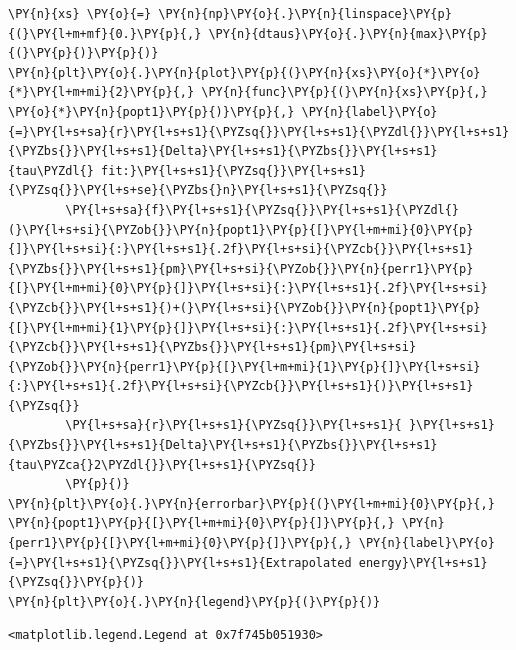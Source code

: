 \begin{tcolorbox}[breakable, size=fbox, boxrule=1pt, pad at break*=1mm,colback=cellbackground, colframe=cellborder]
\begin{Verbatim}[commandchars=\\\{\}]
\PY{n}{xs} \PY{o}{=} \PY{n}{np}\PY{o}{.}\PY{n}{linspace}\PY{p}{(}\PY{l+m+mf}{0.}\PY{p}{,} \PY{n}{dtaus}\PY{o}{.}\PY{n}{max}\PY{p}{(}\PY{p}{)}\PY{p}{)}
\PY{n}{plt}\PY{o}{.}\PY{n}{plot}\PY{p}{(}\PY{n}{xs}\PY{o}{*}\PY{o}{*}\PY{l+m+mi}{2}\PY{p}{,} \PY{n}{func}\PY{p}{(}\PY{n}{xs}\PY{p}{,} \PY{o}{*}\PY{n}{popt1}\PY{p}{)}\PY{p}{,} \PY{n}{label}\PY{o}{=}\PY{l+s+sa}{r}\PY{l+s+s1}{\PYZsq{}}\PY{l+s+s1}{\PYZdl{}}\PY{l+s+s1}{\PYZbs{}}\PY{l+s+s1}{Delta}\PY{l+s+s1}{\PYZbs{}}\PY{l+s+s1}{tau\PYZdl{} fit:}\PY{l+s+s1}{\PYZsq{}}\PY{l+s+s1}{\PYZsq{}}\PY{l+s+se}{\PYZbs{}n}\PY{l+s+s1}{\PYZsq{}}
        \PY{l+s+sa}{f}\PY{l+s+s1}{\PYZsq{}}\PY{l+s+s1}{\PYZdl{}(}\PY{l+s+si}{\PYZob{}}\PY{n}{popt1}\PY{p}{[}\PY{l+m+mi}{0}\PY{p}{]}\PY{l+s+si}{:}\PY{l+s+s1}{.2f}\PY{l+s+si}{\PYZcb{}}\PY{l+s+s1}{\PYZbs{}}\PY{l+s+s1}{pm}\PY{l+s+si}{\PYZob{}}\PY{n}{perr1}\PY{p}{[}\PY{l+m+mi}{0}\PY{p}{]}\PY{l+s+si}{:}\PY{l+s+s1}{.2f}\PY{l+s+si}{\PYZcb{}}\PY{l+s+s1}{)+(}\PY{l+s+si}{\PYZob{}}\PY{n}{popt1}\PY{p}{[}\PY{l+m+mi}{1}\PY{p}{]}\PY{l+s+si}{:}\PY{l+s+s1}{.2f}\PY{l+s+si}{\PYZcb{}}\PY{l+s+s1}{\PYZbs{}}\PY{l+s+s1}{pm}\PY{l+s+si}{\PYZob{}}\PY{n}{perr1}\PY{p}{[}\PY{l+m+mi}{1}\PY{p}{]}\PY{l+s+si}{:}\PY{l+s+s1}{.2f}\PY{l+s+si}{\PYZcb{}}\PY{l+s+s1}{)}\PY{l+s+s1}{\PYZsq{}}
        \PY{l+s+sa}{r}\PY{l+s+s1}{\PYZsq{}}\PY{l+s+s1}{ }\PY{l+s+s1}{\PYZbs{}}\PY{l+s+s1}{Delta}\PY{l+s+s1}{\PYZbs{}}\PY{l+s+s1}{tau\PYZca{}2\PYZdl{}}\PY{l+s+s1}{\PYZsq{}}
        \PY{p}{)}
\PY{n}{plt}\PY{o}{.}\PY{n}{errorbar}\PY{p}{(}\PY{l+m+mi}{0}\PY{p}{,} \PY{n}{popt1}\PY{p}{[}\PY{l+m+mi}{0}\PY{p}{]}\PY{p}{,} \PY{n}{perr1}\PY{p}{[}\PY{l+m+mi}{0}\PY{p}{]}\PY{p}{,} \PY{n}{label}\PY{o}{=}\PY{l+s+s1}{\PYZsq{}}\PY{l+s+s1}{Extrapolated energy}\PY{l+s+s1}{\PYZsq{}}\PY{p}{)}
\PY{n}{plt}\PY{o}{.}\PY{n}{legend}\PY{p}{(}\PY{p}{)}
\end{Verbatim}
\end{tcolorbox}

            \begin{tcolorbox}[breakable, size=fbox, boxrule=.5pt, pad at break*=1mm, opacityfill=0]
\begin{Verbatim}[commandchars=\\\{\}]
<matplotlib.legend.Legend at 0x7f745b051930>
\end{Verbatim}
\end{tcolorbox}
        
    \begin{center}
    \end{center}
    { \hspace*{\fill} \\}
    
